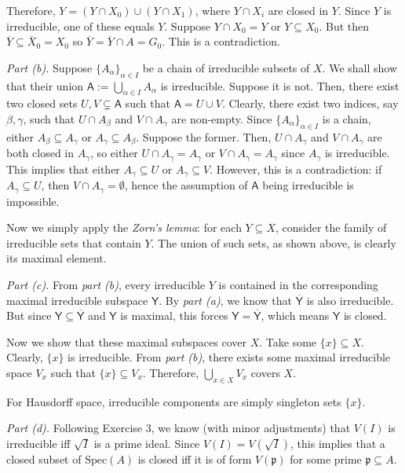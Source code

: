 \documentclass{template}
\begin{document}
Therefore, $Y = (Y \cap X_0) \cup (Y \cap X_1)$, where $Y \cap X_i$ are closed
in $Y$. Since $Y$ is irreducible, one of these equals $Y$. Suppose $Y \cap X_0 =
Y$ or $Y \subseteq X_0$. But then $\overline{Y} \subseteq \overline{X}_0 = X_0$
so $\overline{Y} = \overline{Y} \cap A = G_0$. This is a contradiction. 

\textit{Part (b).} Suppose $\{A_{\alpha}\}_{\alpha \in I}$ be a chain of
irreducible subsets of $X$. We shall show that their union $\mathsf{A} :=
\bigcup_{\alpha \in I}A_{\alpha}$ is irreducible. Suppose it is not. Then, there
exist two closed sets $U,V \subsetneq \mathsf{A}$ such that $\mathsf{A} = U \cup
V$. Clearly, there exist two indices, say $\beta,\gamma$, such that $U \cap
A_{\beta}$ and $V \cap A_{\gamma}$ are non-empty. Since $\{A_{\alpha}\}_{\alpha
\in I}$ is a chain, either $A_{\beta} \subseteq A_{\gamma}$ or $A_{\gamma}
\subseteq A_{\beta}$. Suppose the former. Then, $U \cap A_{\gamma}$ and $V \cap
A_{\gamma}$ are both closed in $A_{\gamma}$, so either $U \cap
A_{\gamma}=A_{\gamma}$ or $V \cap A_{\gamma}=A_{\gamma}$ since $A_{\gamma}$ is
irreducible. This implies that either $A_{\gamma} \subseteq U$ or $A_{\gamma}
\subseteq V$. However, this is a contradiction: if $A_{\gamma} \subseteq U$,
then $V \cap A_{\gamma} = \emptyset$, hence the assumption of $\mathsf{A}$ being
irreducible is impossible. 

Now we simply apply the \textit{Zorn's lemma}: for each $Y \subseteq X$,
consider the family of irreducible sets that contain $Y$. The union of such
sets, as shown above, is clearly its maximal element. 

\textit{Part (c).} From \textit{part (b)}, every irreducible $Y$ is contained in
the corresponding maximal irreducible subspace $\mathsf{Y}$. By \textit{part
(a)}, we know that $\overline{\mathsf{Y}}$ is also irreducible. But since
$\mathsf{Y} \subseteq \overline{\mathsf{Y}}$ and $\mathsf{Y}$ is maximal, this
forces $\mathsf{Y} = \overline{\mathsf{Y}}$, which means $\mathsf{Y}$ is closed. 

Now we show that these maximal subspaces cover $X$. Take some $\{x\} \subseteq
X$. Clearly, $\{x\}$ is irreducible. From \textit{part (b)}, there exists some
maximal irreducible space $V_x$ such that $\{x\} \subseteq V_x$. Therefore,
$\bigcup_{x \in X}V_x$ covers $X$.

For Hausdorff space, irreducible components are simply singleton sets $\{x\}$.

\textit{Part (d).} Following Exercise 3, we know (with minor adjustments) that
$V(I)$ is irreducible iff $\sqrt{I}$ is a prime ideal. Since $V(I)=V(\sqrt{I})$,
this implies that a closed subset of $\text{Spec}(A)$ is closed iff it is of
form $V(\mathfrak{p})$ for some prime $\mathfrak{p} \subseteq A$.
\end{document}
